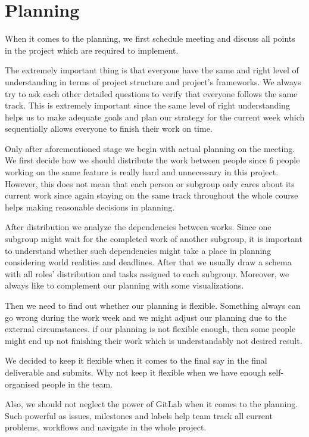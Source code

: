 \section{Planning}

When it comes to the planning, we first schedule meeting and discuss all points in the project which are required to implement.

The extremely important thing is that everyone have the same and right level of understanding in terms of project structure and project's frameworks.
We always try to ask each other detailed questions to verify that everyone follows the same track.
This is extremely important since the same level of right understanding helps us to make adequate goals and
plan our strategy for the current week which sequentially allows everyone to finish their work on time.

Only after aforementioned stage we begin with actual planning on the meeting.
We first decide how we should distribute the work between people since 6 people working on the same feature is really hard and unnecessary in this project.
However, this does not mean that each person or subgroup only cares about its current work since again staying
on the same track throughout the whole course helps making reasonable decisions in planning.

After distribution we analyze the dependencies between works. Since one subgroup might wait for the completed work of another subgroup,
it is important to understand whether such dependencies might take a place in planning considering world realities and deadlines.
After that we usually draw a schema with all roles' distribution and tasks assigned to each subgroup.
Moreover, we always like to complement our planning with some visualizations.

Then we need to find out whether our planning is flexible.
Something always can go wrong during the work week and we might adjust our planning due to the external circumstances.
if our planning is not flexible enough, then some people might end up not finishing their work which is understandably not desired result.

We decided to keep it flexible when it comes to the final say in the final deliverable and submits. Why not keep it flexible
when we have enough self-organised people in the team.

Also, we should not neglect the power of GitLab when it comes to the planning. Such powerful as issues, milestones and labels
help team track all current problems, workflows and navigate in the whole project.